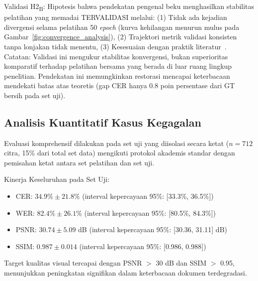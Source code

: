 \documentclass[journal]{IEEEtran}
\begin{document}
Validasi H2\textsubscript{B}: Hipotesis bahwa pendekatan pengenal beku menghasilkan stabilitas pelatihan yang memadai TERVALIDASI melalui: (1) Tidak ada kejadian divergensi selama pelatihan 50 \textit{epoch} (kurva kehilangan menurun mulus pada Gambar~\ref{fig:convergence_analysis}), (2) Trajektori metrik validasi konsisten tanpa lonjakan tidak menentu, (3) Kesesuaian dengan praktik literatur~\cite{souibgui2022}. Catatan: Validasi ini mengukur stabilitas konvergensi, bukan superioritas komparatif terhadap pelatihan bersama yang berada di luar ruang lingkup penelitian. Pendekatan ini memungkinkan restorasi mencapai keterbacaan mendekati batas atas teoretis (gap CER hanya 0.8 poin persentase dari GT bersih pada set uji).

\subsection{Analisis Kuantitatif Kasus Kegagalan}

Evaluasi komprehensif dilakukan pada set uji yang diisolasi secara ketat ($n = 712$ citra, 15\% dari total set data) mengikuti protokol akademis standar dengan pemisahan ketat antara set pelatihan dan set uji.

Kinerja Keseluruhan pada Set Uji:
\begin{itemize}
    \item CER: $34.9\% \pm 21.8\%$ (interval kepercayaan 95\%: [33.3\%, 36.5\%])
    \item WER: $82.4\% \pm 26.1\%$ (interval kepercayaan 95\%: [80.5\%, 84.3\%])
    \item PSNR: $30.74 \pm 5.09$ dB (interval kepercayaan 95\%: [30.36, 31.11] dB)
    \item SSIM: $0.987 \pm 0.014$ (interval kepercayaan 95\%: [0.986, 0.988])
\end{itemize}

Target kualitas visual tercapai dengan PSNR $>$ 30 dB dan SSIM $>$ 0.95, menunjukkan peningkatan signifikan dalam keterbacaan dokumen terdegradasi.
\end{document}
